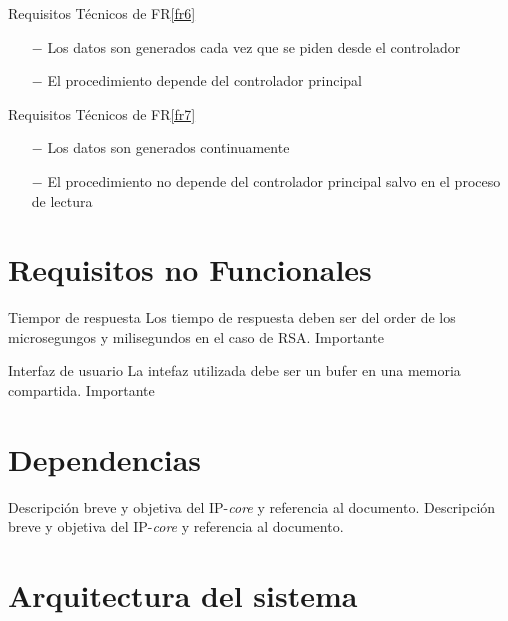 \documentclass[a4paper]{article}
\begin{document}
\begin{technical}
      \techrequirement
      {Requisitos Técnicos de FR\ref{fr6}}
      {
      \begin{itemize}
        \item[$-$]{Los datos son generados cada vez que se piden desde el controlador}
        \item[$-$]{El procedimiento depende del controlador principal}
      \end{itemize}
      }
            
      \techrequirement
      {Requisitos Técnicos de FR\ref{fr7}}
      {
      \begin{itemize}
        \item[$-$]{Los datos son generados continuamente}
        \item[$-$]{El procedimiento no depende del controlador principal salvo en el proceso de lectura}
      \end{itemize}
      }
    \end{technical}    
 
\newpage
\section{Requisitos no Funcionales}

  \begin{nonfunctional}
    {Tiempor de respuesta}
    {Los tiempo de respuesta deben ser del order de los microsegungos y milisegundos en el caso de RSA.}
    {Importante}

    {Interfaz de usuario}
    {La intefaz utilizada debe ser un bufer en una memoria compartida.}
    {Importante}
  \end{nonfunctional}

\section{Dependencias}
  \begin{dependencies}
    {Descripción breve y objetiva del IP-\textit{core} y referencia al documento.}
    {Descripción breve y objetiva del IP-\textit{core} y referencia al documento.}
  \end{dependencies}  

\newpage
\section{Arquitectura del sistema}
\end{document}
